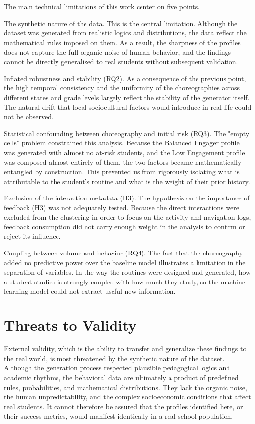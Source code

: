 The main technical limitations of this work center on five points.

The synthetic nature of the data. This is the central limitation. Although the dataset was generated from realistic logics and distributions, the data reflect the mathematical rules imposed on them. As a result, the sharpness of the profiles does not capture the full organic noise of human behavior, and the findings cannot be directly generalized to real students without subsequent validation.

Inflated robustness and stability (RQ2). As a consequence of the previous point, the high temporal consistency and the uniformity of the choreographies across different states and grade levels largely reflect the stability of the generator itself. The natural drift that local sociocultural factors would introduce in real life could not be observed.

Statistical confounding between choreography and initial risk (RQ3). The "empty cells" problem constrained this analysis. Because the Balanced Engager profile was generated with almost no at-risk students, and the Low Engagement profile was composed almost entirely of them, the two factors became mathematically entangled by construction. This prevented us from rigorously isolating what is attributable to the student's routine and what is the weight of their prior history.

Exclusion of the interaction metadata (H3). The hypothesis on the importance of feedback (H3) was not adequately tested. Because the direct interactions were excluded from the clustering in order to focus on the activity and navigation logs, feedback consumption did not carry enough weight in the analysis to confirm or reject its influence.

Coupling between volume and behavior (RQ4). The fact that the choreography added no predictive power over the baseline model illustrates a limitation in the separation of variables. In the way the routines were designed and generated, how a student studies is strongly coupled with how much they study, so the machine learning model could not extract useful new information.

\section{Threats to Validity}
\label{sec:threats-to-validity}

External validity, which is the ability to transfer and generalize these findings to the real world, is most threatened by the synthetic nature of the dataset. Although the generation process respected plausible pedagogical logics and academic rhythms, the behavioral data are ultimately a product of predefined rules, probabilities, and mathematical distributions. They lack the organic noise, the human unpredictability, and the complex socioeconomic conditions that affect real students. It cannot therefore be assured that the profiles identified here, or their success metrics, would manifest identically in a real school population.

